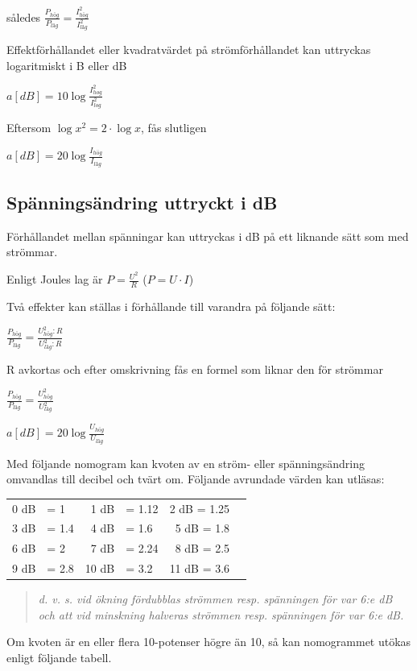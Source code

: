 således \(\frac{P_{hög}}{P_{låg}} = \frac{I_{hög}^2}{I_{låg}^2}\)

Effektförhållandet eller kvadratvärdet på
strömförhållandet kan uttryckas logaritmiskt
i B eller dB

\(a[dB] = 10\log \frac{I_{hog}^2}{I_{log}^2}\)

Eftersom \(\log x^2 = 2 \cdot \log x\), fås slutligen

\(a[dB] = 20\log \frac{I_{hög}}{I_{låg}}\)

\subsection{Spänningsändring uttryckt i dB}

Förhållandet mellan spänningar kan uttryckas i dB på ett liknande sätt som med
strömmar.

Enligt Joules lag är \(P = \frac{U^2}{R}\) (\(P = U \cdot I\))

Två effekter kan ställas i förhållande till varandra på följande sätt:

\(\frac{P_{hög}}{P_{låg}}=\frac{U_{hög}^2:R}{U_{låg}^2:R}\)

R avkortas och efter omskrivning fås en formel som liknar den för strömmar

\(\frac{P_{hög}}{P_{låg}} = \frac{U_{hög}^2}{U_{låg}^2}\)

\(a[dB] = 20\log \frac{U_{hög}}{U_{låg}}\)

Med följande nomogram kan kvoten av en ström- eller spänningsändring omvandlas
till decibel och tvärt om.
Följande avrundade värden kan utläsas:

\begin{tabular}{rlrlrl}
0 dB & = 1   &  1 dB & = 1.12 &  2 dB = 1.25 \\
3 dB & = 1.4 &  4 dB & = 1.6  &  5 dB = 1.8 \\
6 dB & = 2   &  7 dB & = 2.24 &  8 dB = 2.5 \\
9 dB & = 2.8 & 10 dB & = 3.2  & 11 dB = 3.6
\end{tabular}

\begin{quote}\emph{
d. v. s. vid ökning fördubblas strömmen resp. spänningen för var 6:e dB och att
vid minskning halveras strömmen resp. spänningen för var 6:e dB.
}\end{quote}

Om kvoten är en eller flera 10-potenser högre än 10, så kan nomogrammet utökas
enligt följande tabell.


